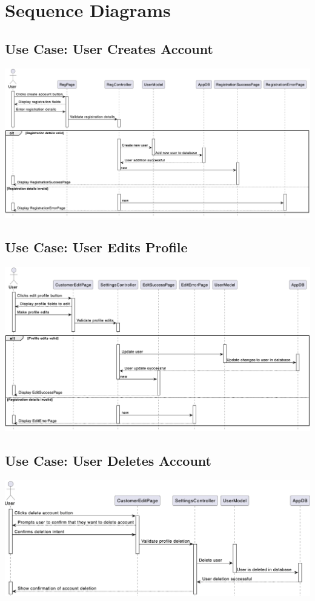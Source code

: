 \documentclass[]{article}
\begin{document}



\section{Sequence Diagrams}
\label{sec:sequence_diagrams}
\subsection*{Use Case: User Creates Account}
\includegraphics[scale=0.45]{Sequence Diagrams/GS1.png}

\subsection*{Use Case: User Edits Profile}
\includegraphics[scale=0.45]{Sequence Diagrams/GS2.png}

\subsection*{Use Case: User Deletes Account}
\includegraphics[scale=0.45]{Sequence Diagrams/GS3.png}
\end{document}
